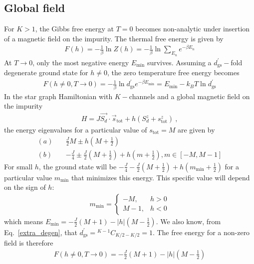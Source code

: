 \documentclass[12pt]{revtex4-2}
\begin{document}
\subsection{Global field}
For \(K>1\), the Gibbs free energy at \(T=0\) becomes non-analytic under insertion of a magnetic field on the impurity. The thermal free energy is given by
\begin{align}
	F(h) = -\frac{1}{\beta}\ln Z(h) = -\frac{1}{\beta}\ln\sum_{E_n}e^{-\beta E_n}
\end{align}
At \(T \to 0\), only the most negative energy \(E_\text{min}\) survives. Assuming a \(d^\prime_\text{gs}-\)fold degenerate ground state for \(h \neq 0\), the zero temperature free energy becomes
\begin{align}
	F(h\neq 0, T\to 0) = -\frac{1}{\beta}\ln d^\prime_\text{gs}e^{-\beta E_\text{min}} = E_\text{min}- k_B T\ln d^\prime_\text{gs}
\end{align}
In the star graph Hamiltonian with \(K-\)channels and a global magnetic field on the impurity
\begin{align}
	H = J \vec{S_d}\cdot\vec{s}_\text{tot} + h\left(S_d^z + s^z_\text{tot}\right) ~,
\end{align}
the energy eigenvalues for a particular value of \(s_\text{tot}=M\) are given by
\begin{align}
	(a) \quad&\frac{J}{2}M \pm h\left(M + \frac{1}{2}\right)\\
	(b) \quad&-\frac{J}{4}\pm \frac{J}{2}\left(M + \frac{1}{2}\right) + h\left( m + \frac{1}{2} \right), m \in \left[-M, M-1\right] 
\end{align}
For small \(h\), the ground state will be \(-\frac{J}{4}- \frac{J}{2}\left(M + \frac{1}{2}\right) + h\left(m_\text{min} + \frac{1}{2} \right)\) for a particular value \(m_\text{min}\) that minimizes this energy. This specific value will depend on the sign of \(h\):
\begin{align}
	m_\text{min} = \begin{cases}
		-M, & h >0\\
		M-1,& h< 0
	\end{cases}
\end{align}
which means \(E_\text{min} = -\frac{J}{2}\left( M + 1 \right) - |h|\left(M - \frac{1}{2}\right)\). We also know, from Eq.~\ref{extra_degen}, that \(d^\prime_\text{gs} = {}^{K-1}C_{K/2 - K/2} = 1\).
The free energy for a non-zero field is therefore
\begin{align}
	F(h\neq 0, T\to 0) = -\frac{J}{2}\left( M + 1 \right) - |h|\left(M - \frac{1}{2}\right)
\end{align}
\end{document}

